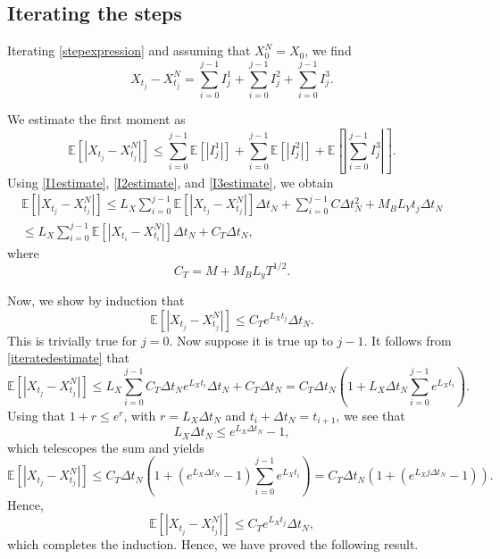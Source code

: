\documentclass[reqno,12pt]{amsart}
\theoremstyle{plain}%
\theoremstyle{definition}
\begin{document}
\subsection{Iterating the steps}

Iterating \eqref{stepexpression} and assuming that $X_0^N = X_0$, we find
\begin{equation}
  \label{iteratedexpression}
  X_{t_j} - X_{t_j}^N = \sum_{i=0}^{j-1} I_j^1 + \sum_{i=0}^{j-1} I_j^2 + \sum_{i=0}^{j-1} I_j^3.
\end{equation}

We estimate the first moment as
\begin{equation}
 \mathbb{E}\left[| X_{t_j} - X_{t_j}^N |\right] \leq \sum_{i=0}^{j-1} \mathbb{E}\left[| I_j^1|\right] + \sum_{i=0}^{j-1} \mathbb{E}\left[|I_j^2 |\right] + \mathbb{E}\left[ \left| \sum_{i=0}^{j-1} I_j^3 \right| \right].
\end{equation}
Using \eqref{I1estimate}, \eqref{I2estimate}, and \eqref{I3estimate}, we obtain
\begin{multline}
\label{iteratedestimate}
 \mathbb{E}\left[| X_{t_j} - X_{t_j}^N |\right] \leq L_X \sum_{i=0}^{j-1} \mathbb{E}\left[|X_{t_j} - X_{t_j}^N|\right]\Delta t_N + \sum_{i=0}^{j-1} C\Delta t_N^2 + M_B L_Y t_j \Delta t_N \\
 \leq L_X \sum_{i=0}^{j-1} \mathbb{E}\left[|X_{t_i} - X_{t_i}^N|\right]\Delta t_N + C_T \Delta t_N,
\end{multline}
where
$$
C_T = M + M_B L_yT^{1/2}.
$$

Now, we show by induction that
$$
 \mathbb{E}\left[| X_{t_j} - X_{t_j}^N |\right] \leq C_T e^{L_X t_j}\Delta t_N .
$$
This is trivially true for $j=0$. Now suppose it is true up to $j-1$. It follows from \eqref{iteratedestimate} that
$$
 \mathbb{E}\left[| X_{t_j} - X_{t_j}^N |\right] \leq L_X \sum_{i=0}^{j-1} C_T \Delta t_N e^{L_X t_i}\Delta t_N + C_T \Delta t_N = C_T \Delta t_N\left( 1 + L_X \Delta t_N \sum_{i=0}^{j-1}  e^{L_X t_i} \right).
$$
Using that $1 + r \leq e^r$, with $r=L_X\Delta t_N$ and $t_i + \Delta t_N = t_{i+1}$, we see that
$$
L_X \Delta t_N \leq e^{L_X \Delta t_N} - 1,
$$
which telescopes the sum and yields
$$
 \mathbb{E}\left[| X_{t_j} - X_{t_j}^N |\right] \leq C_T \Delta t_N\left( 1 + (e^{L_X \Delta t_N} - 1)\sum_{i=0}^{j-1}  e^{L_X t_i} \right) = C_T \Delta t_N  \left(1 + (e^{L_X j\Delta t_N} - 1) \right).
$$
Hence,
$$
 \mathbb{E}\left[| X_{t_j} - X_{t_j}^N |\right] \leq C_T e^{L_X t_j}\Delta t_N ,
$$
which completes the induction. Hence, we have proved the following result.
\end{document}
